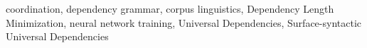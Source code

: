 coordination, dependency grammar, corpus linguistics, Dependency Length Minimization, neural network training, Universal Dependencies, Surface-syntactic Universal Dependencies